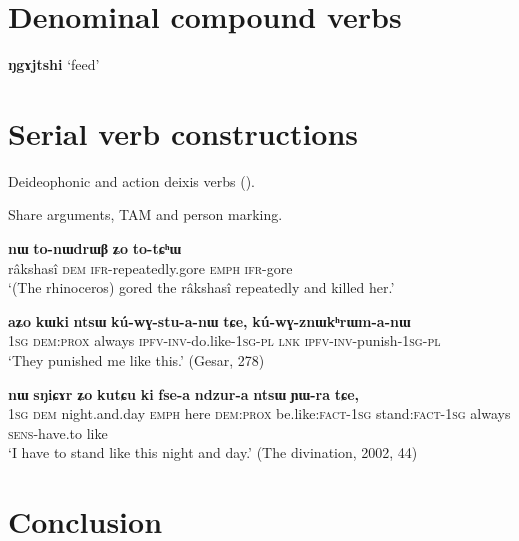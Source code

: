 \documentclass[oldfontcommands,oneside,a4paper,11pt]{article}
\newcommand{\ipa}[1]{{\phon\textbf{#1}}}
\newcommand{\jpg}[2]{\ipa{#1} `#2'}
\begin{document}
\section{Denominal compound verbs} \label{sec:}


\jpg{ŋgɤjtshi}{feed}
\section{Serial verb constructions} \label{sec:serial}

Deideophonic and action deixis verbs (\citealt{sun12complementation}).

Share arguments, TAM and person marking.

\begin{exe}
\ex \label{ex:totChW2}
\gll 	\ipa{srɯnmɯ} 	\ipa{nɯ} 	\ipa{to-nɯdrɯβ} 	\ipa{ʑo} 	 	\ipa{to-tɕʰɯ} \\
 râkshasî \textsc{dem}  \textsc{ifr}-repeatedly.gore  \textsc{emph}  \textsc{ifr}-gore \\
 \glt `(The rhinoceros) gored the râkshasî repeatedly and killed her.' 
\end{exe}	

\begin{exe}
\ex \label{ex:kuWGstuanW}
\gll 	
 \ipa{aʑo} 	\ipa{kɯki} 	\ipa{ntsɯ} 	\ipa{kú-wɣ-stu-a-nɯ} 	\ipa{tɕe,} 	\ipa{kú-wɣ-znɯkʰrɯm-a-nɯ} \\
 \textsc{1sg} \textsc{dem:prox} always \textsc{ipfv-inv}-do.like-\textsc{1sg-pl} \textsc{lnk} \textsc{ipfv-inv}-punish-\textsc{1sg-pl} \\
 \glt `They punished me like this.' (Gesar, 278)
\end{exe}	

\begin{exe}
\ex \label{ex:ki.fsea}
\gll \ipa{aʑo} 	\ipa{nɯ} 	\ipa{sŋiɕɤr} 	\ipa{ʑo} 	\ipa{kutɕu} 	\ipa{ki} 	\ipa{fse-a} 	\ipa{ndzur-a} 	\ipa{ntsɯ} 	\ipa{ɲɯ-ra} 	\ipa{tɕe,} \\
\textsc{1sg} \textsc{dem} night.and.day \textsc{emph} here \textsc{dem:prox} be.like:\textsc{fact-1sg} stand:\textsc{fact-1sg} always \textsc{sens}-have.to like \\
\glt `I have to stand like this night and day.' (The divination, 2002, 44)
\end{exe}

\section{Conclusion}

 




 
\end{document}
